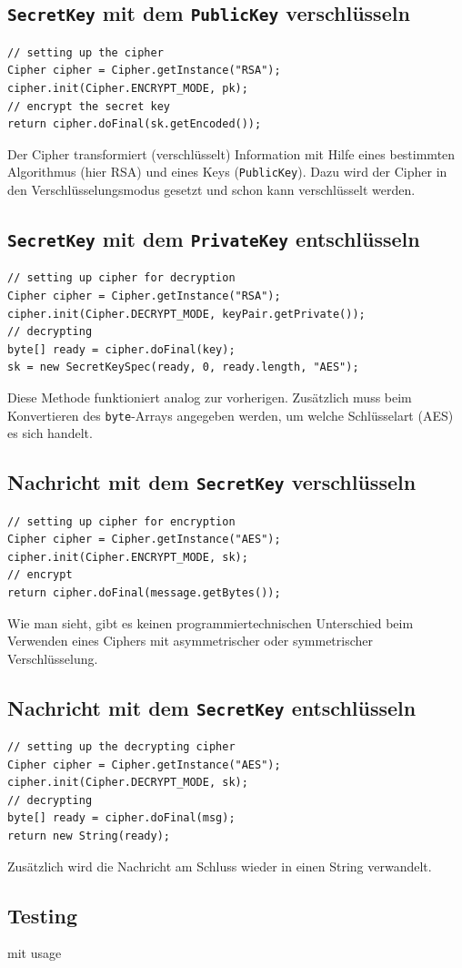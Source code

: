 \subsection{\texttt{SecretKey} mit dem \texttt{PublicKey} verschlüsseln}
\begin{lstlisting}[style=Java, caption=\texttt{SecretKey} mit dem \texttt{PublicKey} verschlüsseln]
// setting up the cipher
Cipher cipher = Cipher.getInstance("RSA");
cipher.init(Cipher.ENCRYPT_MODE, pk);
// encrypt the secret key
return cipher.doFinal(sk.getEncoded());
\end{lstlisting}
Der Cipher transformiert (verschlüsselt) Information mit Hilfe eines bestimmten Algorithmus (hier RSA) und eines Keys (\texttt{PublicKey}). Dazu wird der Cipher in den Verschlüsselungsmodus gesetzt und schon kann verschlüsselt werden.
\clearpage
\subsection{\texttt{SecretKey} mit dem \texttt{PrivateKey} entschlüsseln}
\begin{lstlisting}[style=Java, caption=\texttt{SecretKey} mit dem \texttt{PrivateKey} entschlüsseln]
// setting up cipher for decryption
Cipher cipher = Cipher.getInstance("RSA");
cipher.init(Cipher.DECRYPT_MODE, keyPair.getPrivate());
// decrypting
byte[] ready = cipher.doFinal(key);
sk = new SecretKeySpec(ready, 0, ready.length, "AES");
\end{lstlisting}
Diese Methode funktioniert analog zur vorherigen. Zusätzlich muss beim Konvertieren des \texttt{byte}-Arrays angegeben werden, um welche Schlüsselart (AES) es sich handelt.
\subsection{Nachricht mit dem \texttt{SecretKey} verschlüsseln}
\begin{lstlisting}[style=Java, caption=symmetrische Verschlüsselung]
// setting up cipher for encryption
Cipher cipher = Cipher.getInstance("AES");
cipher.init(Cipher.ENCRYPT_MODE, sk);
// encrypt
return cipher.doFinal(message.getBytes());
\end{lstlisting}
Wie man sieht, gibt es keinen programmiertechnischen Unterschied beim Verwenden eines Ciphers mit asymmetrischer oder symmetrischer Verschlüsselung.
\subsection{Nachricht mit dem \texttt{SecretKey} entschlüsseln}
\begin{lstlisting}[style=Java, caption=symmetrische Entschlüsselung]
// setting up the decrypting cipher
Cipher cipher = Cipher.getInstance("AES");
cipher.init(Cipher.DECRYPT_MODE, sk);
// decrypting
byte[] ready = cipher.doFinal(msg);
return new String(ready);
\end{lstlisting}
Zusätzlich wird die Nachricht am Schluss wieder in einen String verwandelt.
\subsection{Testing}
mit usage
